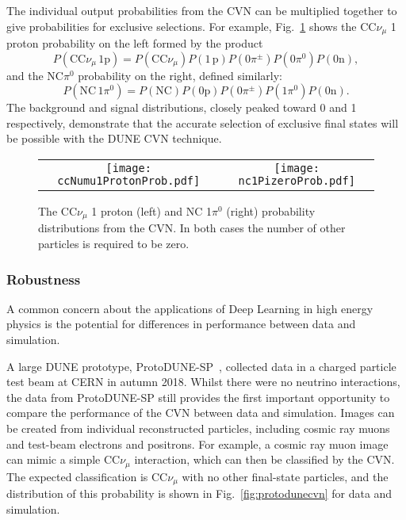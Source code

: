 The individual output probabilities from the CVN can be multiplied together to give probabilities for exclusive selections. For example, Fig.~\ref{fig:exclusive} shows the CC$\nu_\mu$ 1 proton probability on the left formed by the product 
\begin{equation}
P\left(\textrm{CC}\nu_\mu\,1\textrm{p}\right) = P\left(\textrm{CC}\nu_\mu \right) P\left( 1\,\textrm{p} \right) P\left( 0 \pi^\pm \right)P\left( 0 \pi^0 \right) P\left( 0\textrm{n} \right),
\end{equation}
and the NC$\pi^0$ probability on the right, defined similarly: 
\begin{equation}
P\left(\textrm{NC}\,1\pi^0\right) = P\left(\textrm{NC}\right) P\left(0\textrm{p} \right) P\left(0\pi^\pm \right) P\left(1\pi^0 \right) P\left( 0\textrm{n} \right).
\end{equation}
The background and signal distributions, closely peaked toward 0 and 1 respectively, demonstrate that the accurate selection of exclusive final states will be possible with the DUNE CVN technique. 

\begin{figure}
    \centering
    \begin{tabular}{cc}
		\texttt{[image: ccNumu1ProtonProb.pdf]} &
		\texttt{[image: nc1PizeroProb.pdf]}
	\end{tabular}
	\caption{The CC$\nu_\mu$ 1 proton (left) and NC 1$\pi^0$ (right) probability distributions from the CVN. In both cases the number of other particles is required to be zero.}
    \label{fig:exclusive}
\end{figure}

\subsubsection{Robustness}
A common concern about the applications of Deep Learning in high energy physics is the potential for differences in performance between data and simulation. 

A large DUNE prototype, ProtoDUNE-SP~\cite{Abi:2017aow}, collected data in a charged particle test beam at CERN in autumn 2018. Whilst there were no neutrino interactions, the data from ProtoDUNE-SP still provides the first important opportunity to compare the performance of the CVN between data and simulation. Images can be created from individual reconstructed particles, including cosmic ray muons and test-beam electrons and positrons. For example, a cosmic ray muon image
can mimic a simple CC$\nu_\mu$ interaction, which can then be classified by the CVN. The expected classification is CC$\nu_\mu$ with no other final-state particles, and the distribution of this probability is shown in Fig.~\ref{fig:protodunecvn} for data and simulation.

